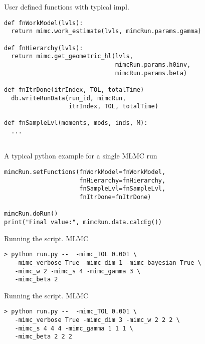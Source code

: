 \begin{frame}[fragile]{User defined functions with typical impl.}
\begin{verbatim}
def fnWorkModel(lvls):
  return mimc.work_estimate(lvls, mimcRun.params.gamma)

def fnHierarchy(lvls):
  return mimc.get_geometric_hl(lvls,
                               mimcRun.params.h0inv,
                               mimcRun.params.beta)

def fnItrDone(itrIndex, TOL, totalTime)
  db.writeRunData(run_id, mimcRun,
                  itrIndex, TOL, totalTime)

def fnSampleLvl(moments, mods, inds, M):
  ...


\end{verbatim}
\end{frame}


\begin{frame}[fragile]{A typical python example for a single MLMC run}
\begin{verbatim}
mimcRun.setFunctions(fnWorkModel=fnWorkModel,
                     fnHierarchy=fnHierarchy,
                     fnSampleLvl=fnSampleLvl,
                     fnItrDone=fnItrDone)

mimcRun.doRun()
print("Final value:", mimcRun.data.calcEg())
\end{verbatim}
\end{frame}

\begin{frame}[fragile]{Running the script. MLMC}
\begin{verbatim}
> python run.py --  -mimc_TOL 0.001 \
   -mimc_verbose True -mimc_dim 1 -mimc_bayesian True \
   -mimc_w 2 -mimc_s 4 -mimc_gamma 3 \
   -mimc_beta 2
\end{verbatim}
\end{frame}

\begin{frame}[fragile]{Running the script. MLMC}
\begin{verbatim}
> python run.py --  -mimc_TOL 0.001 \
   -mimc_verbose True -mimc_dim 3 -mimc_w 2 2 2 \
   -mimc_s 4 4 4 -mimc_gamma 1 1 1 \
   -mimc_beta 2 2 2
\end{verbatim}
\end{frame}

